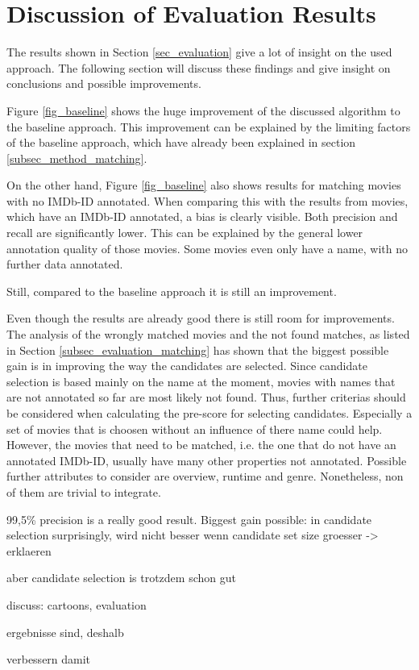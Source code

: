 \section{Discussion of Evaluation Results}
\label{sec_discussion}

The results shown in Section \ref{sec_evaluation} give a lot of insight on the used approach.
The following section will discuss these findings and give insight on conclusions and possible improvements.

Figure \ref{fig_baseline} shows the huge improvement of the discussed algorithm to the baseline approach.
This improvement can be explained by the limiting factors of the baseline approach, which have already been explained in section \ref{subsec_method_matching}.

On the other hand, Figure \ref{fig_baseline} also shows results for matching movies with no IMDb-ID annotated.
When comparing this with the results from movies, which have an IMDb-ID annotated, a bias is clearly visible.
Both precision and recall are significantly lower.
This can be explained by the general lower annotation quality of those movies.
Some movies even only have a name, with no further data annotated.

Still, compared to the baseline approach it is still an improvement.

Even though the results are already good there is still room for improvements.
The analysis of the wrongly matched movies and the not found matches, as listed in Section \ref{subsec_evaluation_matching} has shown that the biggest possible gain is in improving the way the candidates are selected.
Since candidate selection is based mainly on the name at the moment, movies with names that are not annotated so far are most likely not found.
Thus, further criterias should be considered when calculating the pre-score for selecting candidates.
Especially a set of movies that is choosen without an influence of there name could help.
However, the movies that need to be matched, i.e. the one that do not have an annotated IMDb-ID, usually have many other properties not annotated.
Possible further attributes to consider are overview, runtime and genre.
Nonetheless, non of them are trivial to integrate.

99,5\% precision is a really good result.
Biggest gain possible: in candidate selection
surprisingly, wird nicht besser wenn candidate set size groesser -> erklaeren

aber candidate selection is trotzdem schon gut

discuss: cartoons, evaluation

ergebnisse sind, deshalb

verbessern damit

